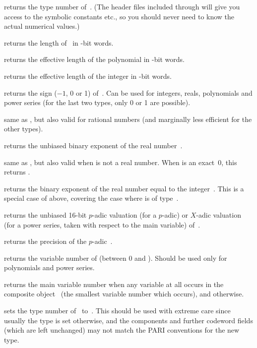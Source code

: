  returns the type number of~. (The header files
included through  will give you access to the symbolic constants
 etc., so you should never need to know the actual numerical values.)

 returns the length of~ in \B-bit words.

 returns the effective length of the polynomial 
in \B-bit words.

 returns the effective length of the integer 
in \B-bit words.

 returns the sign ($-1$, 0 or 1) of~. Can be
used for integers, reals, polynomials and power series (for the last two
types, only 0 or 1 are possible).

 same as , but also valid for rational
numbers (and marginally less efficient for the other types).

 returns the unbiased binary exponent of the real
number~.

 same as , but also valid when 
is not a real number. When  is an exact~0, this returns
\hbox{}.

 returns the binary exponent of the real number equal
to the integer~. This is a special case of  above, covering
the case where  is of type~.

 returns the unbiased 16-bit $p$-adic valuation (for
a $p$-adic) or $X$-adic valuation (for a power series, taken with respect
to the main variable) of~.

 returns the precision of the $p$-adic~.

 returns the variable number of  (between 0 and
). Should be used only for polynomials and power series.

 returns the main variable number when any variable
at all occurs in the composite object~ (the smallest variable number
which occurs), and  otherwise.

 sets the type number of~ to~.
This should be used with extreme care since usually the type is set
otherwise, and the components and further codeword fields (which are left
unchanged) may not match the PARI conventions for the new type.

